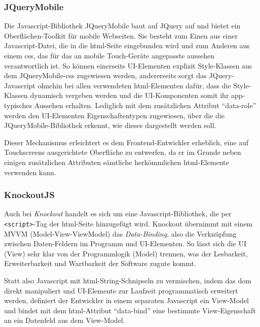 \subsubsection{JQueryMobile}
Die Javascript-Bibliothek JQueryMobile baut auf JQuery auf und bietet ein Oberflächen-Toolkit für mobile Webseiten. Sie besteht zum Einen aus einer Javascript-Datei, die in die \gls{html}-Seite eingebunden wird und zum Anderen aus einem \gls{css}, das für das an mobile Touch-Geräte angepasste aussehen verantwortlich ist. 
So können einerseits UI-Elementen explizit Style-Klassen aus dem JQueryMobile-\gls{css} zugewiesen werden, andererseits sorgt das JQuery-Javascript ohnehin bei allen verwendeten \gls{html}-Elementen dafür, dass die Style-Klassen dynamisch vergeben werden und die UI-Komponenten somit ihr \gls{app}-typisches Aussehen erhalten.
Lediglich mit dem zusätzlichen Attribut \enquote{data-role} werden den UI-Elementen Eigenschaftentypen zugewiesen, über die die JQueryMobile-Bibliothek erkennt, wie dieses dargestellt werden soll.

Dieser Mechanismus erleichtert es dem Frontend-Entwickler erheblich, eine auf Touchscreens ausgerichtete Oberfläche zu entwerfen, da er im Grunde neben einigen zusätzlichen Attributen sämtliche herkömmlichen \gls{html}-Elemente verwenden kann. 

\subsubsection{KnockoutJS}
Auch bei \emph{Knockout} handelt es sich um eine Javascript-Bibliothek, die per \mbox{\texttt{<script>}-Tag} der \gls{html}-Seite hinzugefügt wird. Knockout übernimmt mit einem MVVM (Model-View-ViewModel) das \emph{Data-Binding}, also die Verknüpfung zwischen Daten-Feldern im Programm und UI-Elementen.
So lässt sich die UI (View) sehr klar von der Programmlogik (Model) trennen, was der Lesbarkeit, Erweiterbarkeit und Wartbarkeit der Software zugute kommt.

Statt also Javascript mit \gls{html}-String-Schnipseln zu vermischen, indem das \gls{dom} direkt manipuliert und UI-Elemente zur Laufzeit
programmatisch erweitert werden, definiert der Entwickler in einem separaten Javascript ein View-Model und bindet mit dem \gls{html}-Attribut \enquote{data-bind} eine bestimmte View-Eigenschaft an ein Datenfeld aus dem View-Model.

